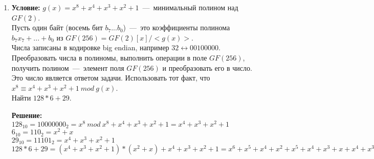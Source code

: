 \documentclass[12pt,a4paper,oneside]{extarticle}
\begin{document}
\begin{enumerate}
    \item {\bf Условие:} $g(x) = x^8 + x^4 + x^3 + x^2 + 1$~---~минимальный полином над $GF(2)$. \\
    Пусть один байт (восемь бит $b_7...b_0$)~---~это коэффициенты полинома $b_7x_7 + ... + b_0$ из $GF(256) = GF(2)[x] / < g(x) > $. \\
    Числа записаны в кодировке big endian, например $32 \leftrightarrow 00100000$. \\
    Преобразовать числа в полиномы, выполнить операции в поле $GF(256)$, получить полином~---~элемент поля $GF(256)$ и преобразовать его в число. Это число является ответом задачи. Использовать тот факт, что $x^8 ≡ x^4 + x^3 + x^2 + 1 ~mod~ g(x)$.\\
    Найти $128*6 + 29$.

        {\bf Решение:}\\
        $128_{10} = 10000000_2 = x^8 ~mod~ x^8 + x^4 + x^3 + x^2 + 1 = x^4 + x^3 + x^2 + 1$\\
        $6_{10} = 110_2 = x^2+x$\\
        $29_{10} = 11101_2 = x^4+x^3+x^2+1$\\
        $128*6+29=(x^4+x^3+x^2+1) * (x^2+x) + x^4+x^3+x^2+1 = x^6+x^5+x^4+x^2+x^5+x^4+x^3+x+x^4+x^3+x^2+1 = x^6+x^4+x+1 = 1010011_2 = 83_{10}$ 

\end{enumerate}
\end{document}

